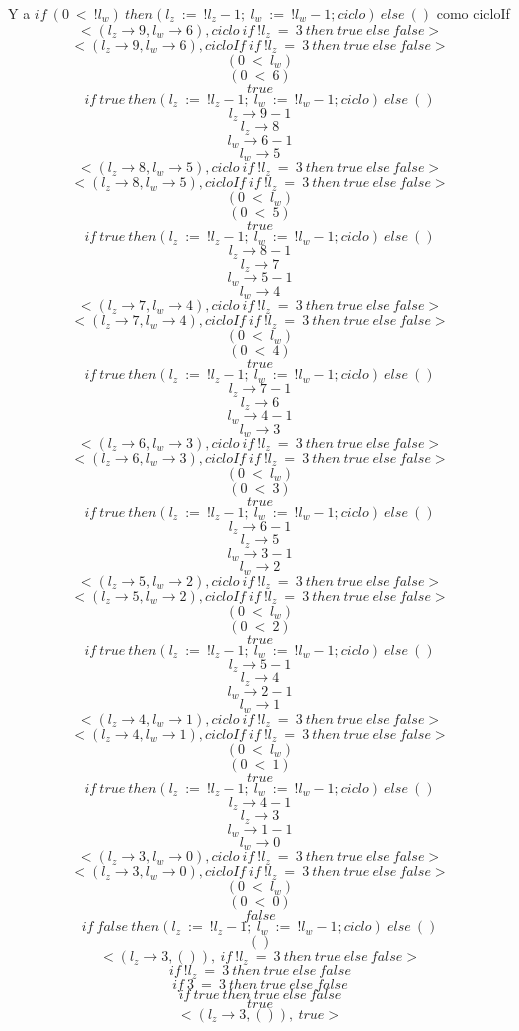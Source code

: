 \documentclass[11pt, a4paper]{report}
\begin{document}
\begin{itemize}
	Y a $if\ (0\ <\ !l_{w})\ then(l_{z}\ :=\ !l_{z}-1;\ l_{w}\ :=\ !l_{w}-1;ciclo)\ else\ ()$ como cicloIf
	$$<(l_{z} \rightarrow 9, l_{w}\rightarrow6),ciclo\ if\ !l_{z}\ =\ 3\ then\ true\ else\ false>$$
	$$<(l_{z} \rightarrow 9, l_{w}\rightarrow6),cicloIf\ if\ !l_{z}\ =\ 3\ then\ true\ else\ false>$$
	$$(0\ <\ l_{w})$$
	$$(0\ <\ 6)$$
	$$true$$
	$$if\ true\ then(l_{z}\ :=\ !l_{z}-1;\ l_{w}\ :=\ !l_{w}-1;ciclo)\ else\ ()$$
	$$l_{z} \rightarrow 9-1$$
	$$l_{z} \rightarrow 8$$
	$$l_{w} \rightarrow 6-1$$
	$$l_{w} \rightarrow 5$$
	$$<(l_{z} \rightarrow 8, l_{w}\rightarrow5),ciclo\ if\ !l_{z}\ =\ 3\ then\ true\ else\ false>$$
	$$<(l_{z} \rightarrow 8, l_{w}\rightarrow5),cicloIf\ if\ !l_{z}\ =\ 3\ then\ true\ else\ false>$$
	$$(0\ <\ l_{w})$$
	$$(0\ <\ 5)$$
	$$true$$
	$$if\ true\ then(l_{z}\ :=\ !l_{z}-1;\ l_{w}\ :=\ !l_{w}-1;ciclo)\ else\ ()$$
	$$l_{z} \rightarrow 8-1$$
	$$l_{z} \rightarrow 7$$
	$$l_{w} \rightarrow 5-1$$
	$$l_{w} \rightarrow 4$$
	$$<(l_{z} \rightarrow 7, l_{w}\rightarrow4),ciclo\ if\ !l_{z}\ =\ 3\ then\ true\ else\ false>$$
	$$<(l_{z} \rightarrow 7, l_{w}\rightarrow4),cicloIf\ if\ !l_{z}\ =\ 3\ then\ true\ else\ false>$$
	$$(0\ <\ l_{w})$$
	$$(0\ <\ 4)$$
	$$true$$
	$$if\ true\ then(l_{z}\ :=\ !l_{z}-1;\ l_{w}\ :=\ !l_{w}-1;ciclo)\ else\ ()$$
	$$l_{z} \rightarrow 7-1$$
	$$l_{z} \rightarrow 6$$
	$$l_{w} \rightarrow 4-1$$
	$$l_{w} \rightarrow 3$$
	$$<(l_{z} \rightarrow 6, l_{w}\rightarrow3),ciclo\ if\ !l_{z}\ =\ 3\ then\ true\ else\ false>$$
	$$<(l_{z} \rightarrow 6, l_{w}\rightarrow3),cicloIf\ if\ !l_{z}\ =\ 3\ then\ true\ else\ false>$$
	$$(0\ <\ l_{w})$$
	$$(0\ <\ 3)$$
	$$true$$
	$$if\ true\ then(l_{z}\ :=\ !l_{z}-1;\ l_{w}\ :=\ !l_{w}-1;ciclo)\ else\ ()$$
	$$l_{z} \rightarrow 6-1$$
	$$l_{z} \rightarrow 5$$
	$$l_{w} \rightarrow 3-1$$
	$$l_{w} \rightarrow 2$$
	$$<(l_{z} \rightarrow 5, l_{w}\rightarrow2),ciclo\ if\ !l_{z}\ =\ 3\ then\ true\ else\ false>$$
	$$<(l_{z} \rightarrow 5, l_{w}\rightarrow2),cicloIf\ if\ !l_{z}\ =\ 3\ then\ true\ else\ false>$$
	$$(0\ <\ l_{w})$$
	$$(0\ <\ 2)$$
	$$true$$
	$$if\ true\ then(l_{z}\ :=\ !l_{z}-1;\ l_{w}\ :=\ !l_{w}-1;ciclo)\ else\ ()$$
	$$l_{z} \rightarrow 5-1$$
	$$l_{z} \rightarrow 4$$
	$$l_{w} \rightarrow 2-1$$
	$$l_{w} \rightarrow 1$$
	$$<(l_{z} \rightarrow 4, l_{w}\rightarrow1),ciclo\ if\ !l_{z}\ =\ 3\ then\ true\ else\ false>$$
	$$<(l_{z} \rightarrow 4, l_{w}\rightarrow1),cicloIf\ if\ !l_{z}\ =\ 3\ then\ true\ else\ false>$$
	$$(0\ <\ l_{w})$$
	$$(0\ <\ 1)$$
	$$true$$
	$$if\ true\ then(l_{z}\ :=\ !l_{z}-1;\ l_{w}\ :=\ !l_{w}-1;ciclo)\ else\ ()$$
	$$l_{z} \rightarrow 4-1$$
	$$l_{z} \rightarrow 3$$
	$$l_{w} \rightarrow 1-1$$
	$$l_{w} \rightarrow 0$$
	$$<(l_{z} \rightarrow 3, l_{w}\rightarrow0),ciclo\ if\ !l_{z}\ =\ 3\ then\ true\ else\ false>$$
	$$<(l_{z} \rightarrow 3, l_{w}\rightarrow0),cicloIf\ if\ !l_{z}\ =\ 3\ then\ true\ else\ false>$$
	$$(0\ <\ l_{w})$$
	$$(0\ <\ 0)$$
	$$false$$
	$$if\ false\ then(l_{z}\ :=\ !l_{z}-1;\ l_{w}\ :=\ !l_{w}-1;ciclo)\ else\ ()$$
	$$()$$
	$$<(l_{z}\rightarrow3,()),\ if\ !l_{z}\ =\ 3\ then\ true\ else\ false>$$
	$$if\ !l_{z}\ =\ 3\ then\ true\ else\ false$$
	$$if\ 3\ =\ 3\ then\ true\ else\ false$$
	$$if\ true\ then\ true\ else\ false$$
	$$true$$
	$$<(l_{z}\rightarrow3,()),\ true>$$
\end{itemize}
\end{document}
